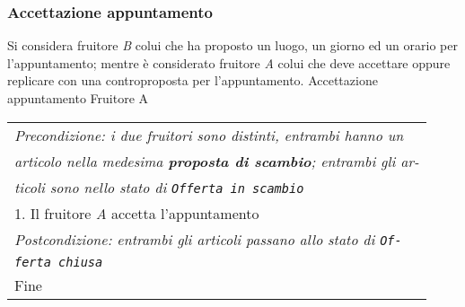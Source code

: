 \begin{minipage}{\textwidth}
    \subsubsection{Accettazione appuntamento}
    Si considera fruitore \textit{B} colui che ha proposto un luogo, un giorno ed un orario per l'appuntamento; mentre è considerato fruitore \textit{A} colui che deve accettare oppure replicare con una controproposta per l'appuntamento.
    \usecase
        {Accettazione appuntamento}
        {
            Fruitore A\\
        }
        {
            \begin{tabular}{l}
                \textit{Precondizione: i due fruitori sono distinti, entrambi hanno un}\\
                \textit{articolo nella medesima \textbf{proposta di scambio}; entrambi gli ar-}\\
                \textit{ticoli sono nello stato di \texttt{Offerta in scambio}}\\
                1. Il fruitore \textit{A} accetta l'appuntamento\\
                \textit{Postcondizione: entrambi gli articoli passano allo stato di \texttt{Of-}}\\
                \textit{\texttt{ferta chiusa}}\\
                Fine
            \end{tabular}\\

            \\

}
\end{minipage}
